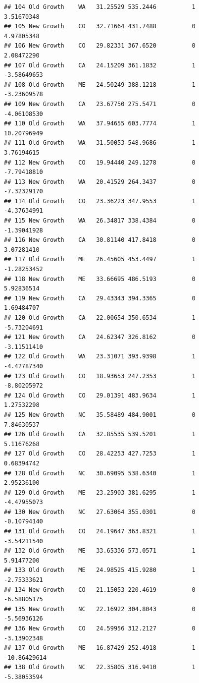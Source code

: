 \documentclass[
]{article}
\begin{document}
\begin{verbatim}
## 104 Old Growth    WA   31.25529 535.2446          1          3.51670348
## 105 New Growth    CO   32.71664 431.7488          0          4.97805348
## 106 New Growth    CO   29.82331 367.6520          0          2.08472290
## 107 Old Growth    CA   24.15209 361.1832          1         -3.58649653
## 108 Old Growth    ME   24.50249 388.1218          1         -3.23609578
## 109 New Growth    CA   23.67750 275.5471          0         -4.06108530
## 110 Old Growth    WA   37.94655 603.7774          1         10.20796949
## 111 Old Growth    WA   31.50053 548.9686          1          3.76194615
## 112 New Growth    CO   19.94440 249.1278          0         -7.79418810
## 113 New Growth    WA   20.41529 264.3437          0         -7.32329170
## 114 Old Growth    CO   23.36223 347.9553          1         -4.37634991
## 115 New Growth    WA   26.34817 338.4384          0         -1.39041928
## 116 New Growth    CA   30.81140 417.8418          0          3.07281410
## 117 Old Growth    ME   26.45605 453.4497          1         -1.28253452
## 118 New Growth    ME   33.66695 486.5193          0          5.92836514
## 119 New Growth    CA   29.43343 394.3365          0          1.69484707
## 120 Old Growth    CA   22.00654 350.6534          1         -5.73204691
## 121 New Growth    CA   24.62347 326.8162          0         -3.11511410
## 122 Old Growth    WA   23.31071 393.9398          1         -4.42787340
## 123 Old Growth    CO   18.93653 247.2353          1         -8.80205972
## 124 Old Growth    CO   29.01391 483.9634          1          1.27532298
## 125 New Growth    NC   35.58489 484.9001          0          7.84630537
## 126 Old Growth    CA   32.85535 539.5201          1          5.11676268
## 127 Old Growth    CO   28.42253 427.7253          1          0.68394742
## 128 Old Growth    NC   30.69095 538.6340          1          2.95236100
## 129 Old Growth    ME   23.25903 381.6295          1         -4.47955073
## 130 New Growth    NC   27.63064 355.0301          0         -0.10794140
## 131 Old Growth    CO   24.19647 363.8321          1         -3.54211540
## 132 Old Growth    ME   33.65336 573.0571          1          5.91477200
## 133 Old Growth    ME   24.98525 415.9280          1         -2.75333621
## 134 New Growth    CO   21.15053 220.4619          0         -6.58805175
## 135 New Growth    NC   22.16922 304.8043          0         -5.56936126
## 136 New Growth    CO   24.59956 312.2127          0         -3.13902348
## 137 Old Growth    ME   16.87429 252.4918          1        -10.86429614
## 138 Old Growth    NC   22.35805 316.9410          1         -5.38053594

\end{verbatim}
\end{document}
